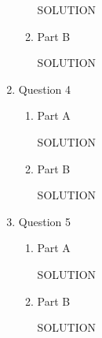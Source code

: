 \documentclass[12pt]{article}
\begin{document}
\begin{enumerate}
\begin{enumerate}
  SOLUTION

  \item Part B  %

  SOLUTION
  \end{enumerate}
\newpage

\item Question 4
  \begin{enumerate}
  \item Part A  %

  SOLUTION

  \item Part B  %

  SOLUTION
  \end{enumerate}
\newpage

\item Question 5
  \begin{enumerate}
  \item Part A  %

  SOLUTION

  \item Part B  %

  SOLUTION
  \end{enumerate}
\newpage

\end{enumerate}
\end{document}
